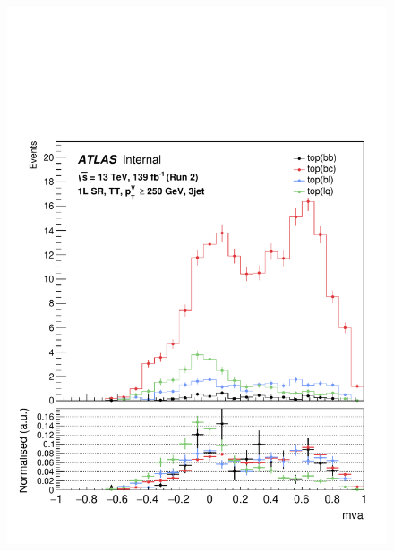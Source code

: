 \begin{figure}[h!]
\includegraphics[scale=0.253]{Images/VH/top/OneLepton_top_2tttag3jet_SR_250ptv_mva.pdf} \\


\end{figure}
